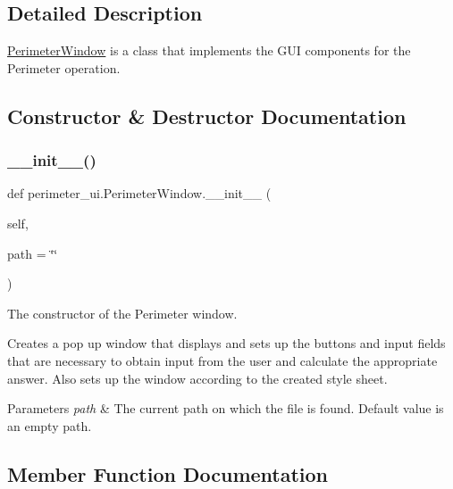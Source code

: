 \subsection{Detailed Description}
\hyperlink{classperimeter__ui_1_1_perimeter_window}{Perimeter\+Window} is a class that implements the G\+UI components for the Perimeter operation. 

\subsection{Constructor \& Destructor Documentation}
\mbox{\label{classperimeter__ui_1_1_perimeter_window_aa763b2caa5f3425d4666e237a58c1dc3}} 
\subsubsection{\texorpdfstring{\+\_\+\+\_\+init\+\_\+\+\_\+()}{\_\_init\_\_()}}
{\footnotesize\ttfamily def perimeter\+\_\+ui.\+Perimeter\+Window.\+\_\+\+\_\+init\+\_\+\+\_\+ (\begin{DoxyParamCaption}\item[{}]{self,  }\item[{}]{path = {\ttfamily \char`\"{}\char`\"{}} }\end{DoxyParamCaption})}



The constructor of the Perimeter window. 

Creates a pop up window that displays and sets up the buttons and input fields that are necessary to obtain input from the user and calculate the appropriate answer. Also sets up the window according to the created style sheet. 
\begin{DoxyParams}{Parameters}
{\em path} & The current path on which the file is found. Default value is an empty path. \\
\hline
\end{DoxyParams}


\subsection{Member Function Documentation}
\mbox{\label{classperimeter__ui_1_1_perimeter_window_afdeb1c9d24171741ae3077eaa4e2070d}} 
